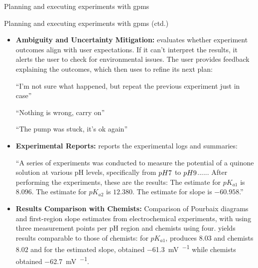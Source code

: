 \begin{reply}
\begin{examplebox}[label={example:chemcrow_organa}]{Planning and executing experiments with \glspl{gpm}}
\begin{itemize}
\end{itemize}

\end{examplebox}



\begin{examplebox}{Planning and executing experiments with \glspl{gpm} (ctd.)}

\begin{itemize}
    \item \textbf{Ambiguity and Uncertainty Mitigation:} 
     evaluates whether experiment outcomes align with user expectations. If it can’t interpret the results, it alerts the user to check for environmental issues. The user provides feedback explaining the outcomes, which  then uses to refine its next plan:
    
    \enquote{I’m not sure what happened, but repeat the previous experiment just in case}
    
    \enquote{Nothing is wrong, carry on}

    \enquote{The pump was stuck, it's ok again}

    \tcbbreak

    \item \textbf{Experimental Reports:} 
     reports the experimental logs and summaries:
    
    \enquote{A series of experiments was conducted to measure the potential of a quinone solution at various pH levels, specifically from $pH \space 7$ to $pH \space 9$......
    After performing the experiments, these are the results:
    The estimate for $pK_{a1}$ is $8.096$.
    The estimate for $pK_{a2}$ is $12.380$.
    The estimate for slope is $-60.958$.}

    \item \textbf{Results Comparison with Chemists:} Comparison of Pourbaix diagrams and first-region slope estimates from electrochemical experiments, with  using three measurement points per pH region and chemists using four.  yields results comparable to those of chemists: for $pK_{a1}$,  produces $8.03$ and chemists $8.02$ and for the estimated slope,  obtained \SI[per-mode=symbol]{-61.3}{\milli\volt\per\pH} while chemists obtained \SI[per-mode=symbol]{-62.7}{\milli\volt\per\pH}.
\end{itemize}
\end{examplebox}


\end{reply}
